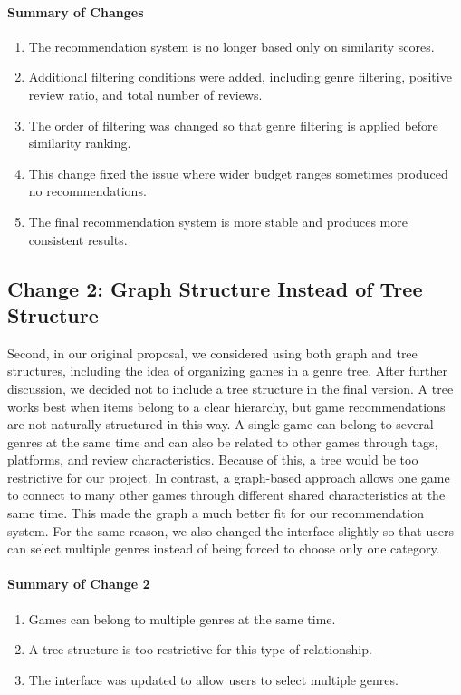 \documentclass[fontsize=11pt]{article}
\begin{document}
\paragraph{Summary of Changes}
\begin{enumerate}
    \item The recommendation system is no longer based only on similarity scores.
    \item Additional filtering conditions were added, including genre filtering, positive review ratio, and total number of reviews.
    \item The order of filtering was changed so that genre filtering is applied before similarity ranking.
    \item This change fixed the issue where wider budget ranges sometimes produced no recommendations.
    \item The final recommendation system is more stable and produces more consistent results.
\end{enumerate}

\newpage

\subsection*{Change 2: Graph Structure Instead of Tree Structure}

Second, in our original proposal, we considered using both graph and tree structures, including the idea of organizing games in a genre tree. After further discussion, we decided not to include a tree structure in the final version. A tree works best when items belong to a clear hierarchy, but game recommendations are not naturally structured in this way. A single game can belong to several genres at the same time and can also be related to other games through tags, platforms, and review characteristics. Because of this, a tree would be too restrictive for our project. In contrast, a graph-based approach allows one game to connect to many other games through different shared characteristics at the same time. This made the graph a much better fit for our recommendation system. For the same reason, we also changed the interface slightly so that users can select multiple genres instead of being forced to choose only one category.

\paragraph{Summary of Change 2}
\begin{enumerate}
    \item Games can belong to multiple genres at the same time.
    \item A tree structure is too restrictive for this type of relationship.
    \item The interface was updated to allow users to select multiple genres.
\end{enumerate}
\end{document}
